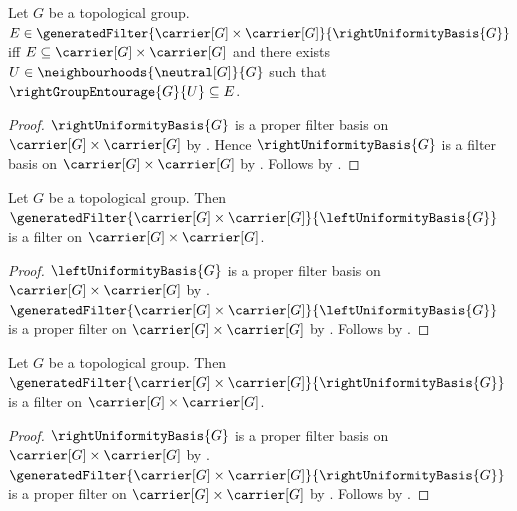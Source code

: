 \begin{proposition}\label{right_generated_uniformity_iff}
    Let $G$ be a topological group.
    $E\in\generatedFilter
        {\carrier[G]\times\carrier[G]}{\rightUniformityBasis{G}}$ iff
        $E\subseteq\carrier[G]\times\carrier[G]$ and there exists
        $U\in\neighbourhoods{\neutral[G]}{G}$ such that
            $\rightGroupEntourage{G}{U}\subseteq E$.
\end{proposition}
\begin{proof}
    $\rightUniformityBasis{G}$ is a proper filter basis on
        $\carrier[G]\times\carrier[G]$ by
        .
    Hence $\rightUniformityBasis{G}$ is a filter basis on
        $\carrier[G]\times\carrier[G]$ by
        .
    Follows by
        .
\end{proof}

\begin{theorem}\label{left_generated_uniformity_is_filter}
    Let $G$ be a topological group.
    Then $\generatedFilter
        {\carrier[G]\times\carrier[G]}{\leftUniformityBasis{G}}$
        is a filter on $\carrier[G]\times\carrier[G]$.
\end{theorem}
\begin{proof}
    $\leftUniformityBasis{G}$ is a proper filter basis on
        $\carrier[G]\times\carrier[G]$
        by .
    $\generatedFilter
        {\carrier[G]\times\carrier[G]}{\leftUniformityBasis{G}}$
        is a proper filter on $\carrier[G]\times\carrier[G]$ by
        .
    Follows by .
\end{proof}

\begin{theorem}\label{right_generated_uniformity_is_filter}
    Let $G$ be a topological group.
    Then $\generatedFilter
        {\carrier[G]\times\carrier[G]}{\rightUniformityBasis{G}}$
        is a filter on $\carrier[G]\times\carrier[G]$.
\end{theorem}
\begin{proof}
    $\rightUniformityBasis{G}$ is a proper filter basis on
        $\carrier[G]\times\carrier[G]$
        by .
    $\generatedFilter
        {\carrier[G]\times\carrier[G]}{\rightUniformityBasis{G}}$
        is a proper filter on $\carrier[G]\times\carrier[G]$ by
        .
    Follows by .
\end{proof}

